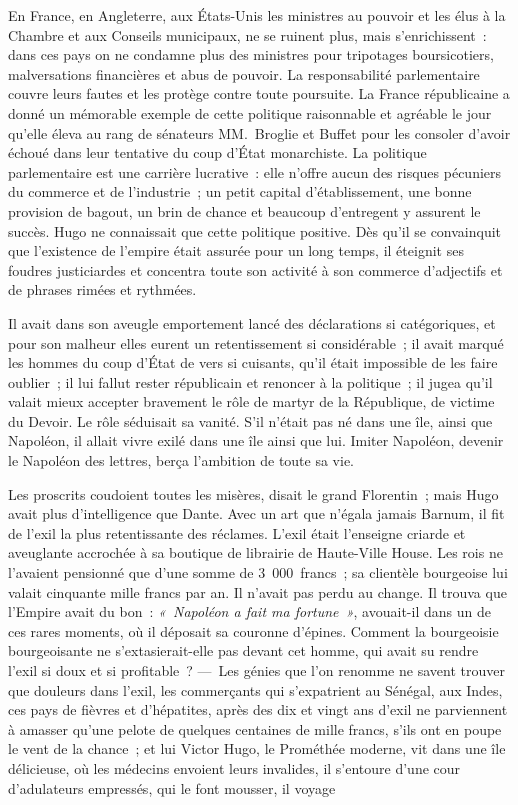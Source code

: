 \documentclass[french,twoside]{book} %
\begin{document}
\label{p37}En France, en Angleterre, aux États-Unis les ministres au pouvoir et les élus à la Chambre et aux Conseils municipaux, ne se ruinent plus, mais s’enrichissent : dans ces pays on ne condamne plus des ministres pour tripotages boursicotiers, malversations financières et abus de pouvoir. La responsabilité parlementaire couvre leurs fautes et les protège contre toute poursuite. La France républicaine a donné un mémorable exemple de cette politique raisonnable et agréable le jour qu’elle éleva au rang de sénateurs MM. Broglie et Buffet pour les consoler d’avoir échoué dans leur tentative du coup d’État monarchiste. La politique parlementaire est une carrière lucrative : elle n’offre aucun des risques pécuniers du commerce et de l’industrie ; un petit capital d’établissement, une bonne provision de bagout, un brin de chance et beaucoup d’entregent y assurent le succès. Hugo ne connaissait que cette politique positive. Dès qu’il se convainquit que l’existence de l’empire était assurée pour un long temps, il éteignit ses foudres justiciardes et concentra toute son activité à son commerce d’adjectifs et de phrases rimées et rythmées.\par
Il avait dans son aveugle emportement lancé des déclarations si catégoriques, et pour son malheur elles eurent un retentissement si considérable ; il avait marqué les hommes du coup d’État de vers si cuisants, qu’il était impossible de les faire oublier ; il lui fallut rester républicain et renoncer à la politique ; il jugea qu’il valait mieux accepter  
\label{p38}bravement le rôle de martyr de la République, de victime du Devoir. Le rôle séduisait sa vanité. S’il n’était pas né dans une île, ainsi que Napoléon, il allait vivre exilé dans une île ainsi que lui. Imiter Napoléon, devenir le Napoléon des lettres, berça l’ambition de toute sa vie.\par
Les proscrits coudoient toutes les misères, disait le grand Florentin ; mais Hugo avait plus d’intelligence que Dante. Avec un art que n’égala jamais Barnum, il fit de l’exil la plus retentissante des réclames. L’exil était l’enseigne criarde et aveuglante accrochée à sa boutique de librairie de Haute-Ville House. Les rois ne l’avaient pensionné que d’une somme de 3 000 francs ; sa clientèle bourgeoise lui valait cinquante mille francs par an. Il n’avait pas perdu au change. Il trouva que l’Empire avait du bon : \emph{« Napoléon a fait ma fortune »}, avouait-il dans un de ces rares moments, où il déposait sa couronne d’épines. Comment la bourgeoisie bourgeoisante ne s’extasierait-elle pas devant cet homme, qui avait su rendre l’exil si doux et si profitable ? — Les génies que l’on renomme ne savent trouver que douleurs dans l’exil, les commerçants qui s’expatrient au Sénégal, aux Indes, ces pays de fièvres et d’hépatites, après des dix et vingt ans d’exil ne parviennent à amasser qu’une pelote de quelques centaines de mille francs, s’ils ont en poupe le vent de la chance ; et lui Victor Hugo, le Prométhée moderne, vit dans une île délicieuse, où les médecins envoient leurs invalides, il s’entoure d’une cour d’adulateurs empressés, qui le font mousser, il voyage  
\end{document}

